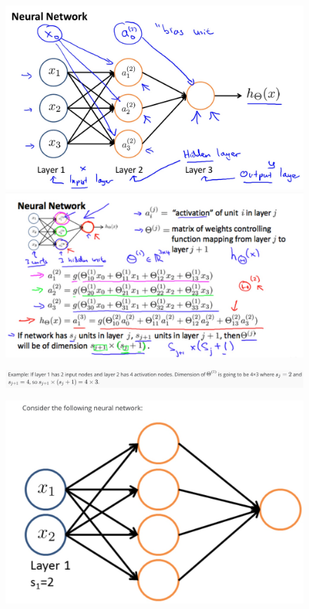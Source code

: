 \documentclass[12pt, A4,onecolumn]{article} %
\begin{document}
\begin{figure}[H]
  \includegraphics[width=\linewidth]{./ImagenesW4/neuralNetwork1}
\endminipage\hfill
{}
  \includegraphics[width=\linewidth]{./ImagenesW4/modelRep4}
\endminipage\hfill
\end{figure}

\begin{figure}[H]
	\centering
	\includegraphics[width=1\textwidth]{./ImagenesW4/modelRep5}
\end{figure}

\begin{figure}[H]
	\centering
	\includegraphics[width=1\textwidth]{./ImagenesW4/testmrep1_1}
\end{figure}
\end{document}
